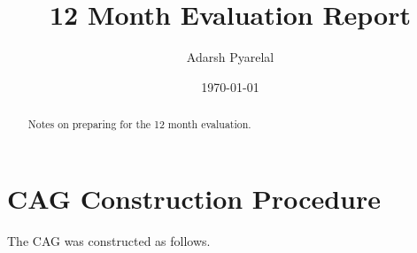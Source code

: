 \documentclass{apnotes}
\title{12 Month Evaluation Report}
\author{Adarsh Pyarelal}
\date{\today}
\begin{document}
\maketitle

\bigskip
\bigskip

\begin{abstract}
  Notes on preparing for the 12 month evaluation.
\end{abstract}

\tableofcontents*

\bigskip
\bigskip


\chapter{CAG Construction Procedure}

The CAG was constructed as follows.
\end{document}
